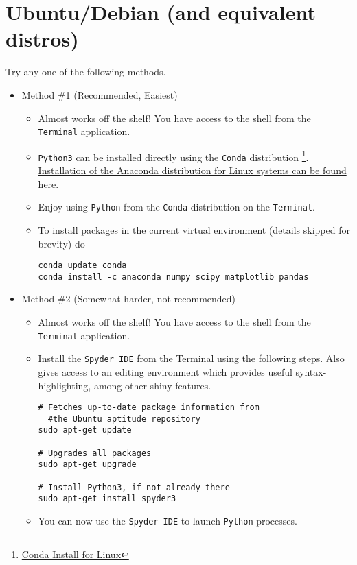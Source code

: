 \documentclass[11pt]{article}
\begin{document}
\section*{Ubuntu/Debian (and equivalent distros)}
\label{sec:orgef710f3}
Try any one of the following methods.

\begin{itemize}
\item Method \#1 (Recommended, Easiest)
\label{sec:orgf55f4e8}
\begin{itemize}
\item Almost works off the shelf! You have access to the shell from the \texttt{Terminal} application.
\item \texttt{Python3} can be installed directly using the \texttt{Conda} distribution \footnote{\href{https://www.anaconda.com/download/\#linux}{Conda Install for Linux}}. \href{https://www.anaconda.com/download/\#linux}{Installation of the Anaconda distribution for Linux systems can be found here.}
\item Enjoy using \texttt{Python} from the \texttt{Conda} distribution on the \texttt{Terminal}.
\item To install packages in the current virtual environment (details skipped for
brevity) do
\begin{verbatim}
conda update conda
conda install -c anaconda numpy scipy matplotlib pandas
\end{verbatim}
\end{itemize}

\item Method \#2 (Somewhat harder, not recommended)
\label{sec:org80d926a}

\begin{itemize}
\item Almost works off the shelf! You have access to the shell from the \texttt{Terminal} application.
\item Install the \texttt{Spyder IDE} from the Terminal using the following steps. Also
gives access to an editing environment which provides useful
syntax-highlighting, among other shiny features.

\begin{verbatim}
# Fetches up-to-date package information from
  #the Ubuntu aptitude repository
sudo apt-get update

# Upgrades all packages
sudo apt-get upgrade

# Install Python3, if not already there
sudo apt-get install spyder3
\end{verbatim}
\item You can now use the \texttt{Spyder IDE} to launch \texttt{Python} processes.
\end{itemize}


\end{itemize}
\end{document}
